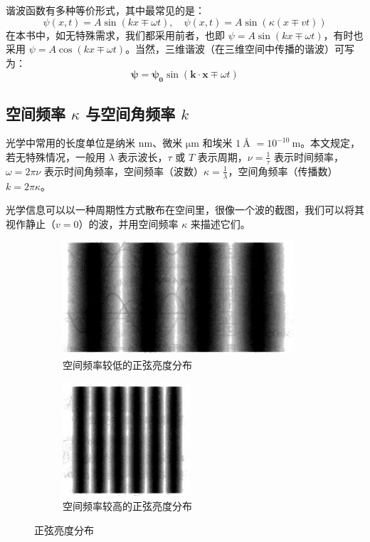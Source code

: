 \documentclass[UTF8]{report}
\theoremstyle{MyLineTheoremStyle} %
\theoremstyle{MyBlockTheoremStyle} %
\theoremstyle{MySubsubsectionStyle} %
\begin{document}
谐波函数有多种等价形式，其中最常见的是：
\begin{equation}
    \psi(x,t)=A\sin(kx\mp\omega t) ,\quad \psi(x,t)=A\sin \left(  \kappa (x\mp vt) \right)
\end{equation}
在本书中，如无特殊需求，我们都采用前者，也即 $\psi = A\sin(kx\mp\omega t)$，有时也采用 $\psi = A\cos(kx\mp\omega t)$。当然，三维谐波（在三维空间中传播的谐波）可写为：
\begin{equation}
    \boldsymbol{\psi}=\boldsymbol{\psi_0}\sin(\boldsymbol{k}\cdot \boldsymbol{x} \mp \omega t)
\end{equation}

\subsection{空间频率 $\kappa$ 与空间角频率 $k$}

光学中常用的长度单位是纳米 $\mathrm{nm}$、微米 $\mathrm{\mu m}$ 和埃米 $1\ \si{\angstrom}$ $ = 10^{-10}\ \mathrm{m}$。本文规定，若无特殊情况，一般用 $\lambda$ 表示波长，$\tau $ 或 $T$ 表示周期，$\nu = \frac{1}{\tau}$ 表示时间频率，$\omega = 2\pi\nu$ 表示时间角频率，空间频率（波数）$\kappa = \frac{1}{\lambda}$，空间角频率（传播数）$k = 2\pi \kappa$。

光学信息可以以一种周期性方式散布在空间里，很像一个波的截图，我们可以将其视作静止（$v=0$）的波，并用空间频率 $\kappa$ 来描述它们。

\begin{figure}[H]\centering
\begin{subfigure}[t]{0.62\columnwidth}\centering
    \includegraphics[height=120pt]{assets/1,2/image (41).jpg}
    \caption{ 空间频率较低的正弦亮度分布 }
\end{subfigure}\begin{subfigure}[t]{0.37\columnwidth}\centering
    \includegraphics[height=120pt]{assets/1,2/image (42).jpg}
    \caption{ 空间频率较高的正弦亮度分布 }
\end{subfigure}
\caption{ 正弦亮度分布 }
\end{figure}
\end{document}
